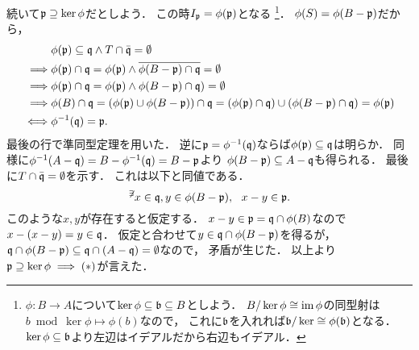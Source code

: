 \documentclass[a4paper]{jsarticle}
\begin{document}
    続いて$\mathfrak{p} \supseteq \ker \phi$だとしよう．
    この時$I_{\mathfrak{p}}=\phi(\mathfrak{p})$となる
    \footnote
    {
    $\phi: B \to A$について$\ker \phi \subseteq \mathfrak{b} \subseteq B$としよう．
    $B/\ker \phi \cong \operatorname{im} \phi$の同型射は$b \bmod \ker \phi \mapsto \phi(b)$なので，
    これに$\mathfrak{b}$を入れれば$\mathfrak{b}/\ker \cong \phi(\mathfrak{b})$となる．
    $\ker \phi \subseteq \mathfrak{b}$より左辺はイデアルだから右辺もイデアル．
    }．
    $\phi(S)=\phi(B-\mathfrak{p})$だから，
    \begin{align*}
        {}&         \phi(\mathfrak{p}) \subseteq \mathfrak{q} \land T \cap \bar{\mathfrak{q}}=\emptyset \\
        \implies&   \phi(\mathfrak{p}) \cap \mathfrak{q}=\phi(\mathfrak{p}) \land \overline{\phi(B-\mathfrak{p}) \cap \mathfrak{q}}=\emptyset \\
        \implies&   \phi(\mathfrak{p}) \cap \mathfrak{q}=\phi(\mathfrak{p}) \land \phi(B-\mathfrak{p}) \cap \mathfrak{q})=\emptyset \\
        \implies&   \phi(B) \cap \mathfrak{q}
                    =\left( \phi(\mathfrak{p}) \cup \phi(B-\mathfrak{p}) \right) \cap \mathfrak{q}
                    =(\phi(\mathfrak{p}) \cap \mathfrak{q}) \cup (\phi(B-\mathfrak{p}) \cap \mathfrak{q})
                    =\phi(\mathfrak{p}) \\
        \iff&   \phi^{-1}(\mathfrak{q})=\mathfrak{p}.
    \end{align*}
    最後の行で準同型定理を用いた．
    逆に$\mathfrak{p}=\phi^{-1}(\mathfrak{q})$ならば$\phi(\mathfrak{p}) \subseteq \mathfrak{q}$は明らか．
    同様に$\phi^{-1}(A-\mathfrak{q})=B-\phi^{-1}(\mathfrak{q})=B-\mathfrak{p}$より
    $\phi(B-\mathfrak{p}) \subseteq A-\mathfrak{q}$も得られる．
    最後に$T \cap \bar{\mathfrak{q}}=\emptyset$を示す．
    これは以下と同値である．
    \[ {}^{\not \exists} x \in \mathfrak{q}, y \in \phi(B-\mathfrak{p}),~~ x-y \in \mathfrak{p}. \]
    このような$x,y$が存在すると仮定する．
    $x-y \in \mathfrak{p}=\mathfrak{q} \cap \phi(B)$なので$x-(x-y)=y \in \mathfrak{q}$．
    仮定と合わせて$y \in \mathfrak{q} \cap \phi(B-\mathfrak{p})$を得るが，
    $\mathfrak{q} \cap \phi(B-\mathfrak{p}) \subseteq \mathfrak{q} \cap (A-\mathfrak{q})=\emptyset$なので，
    矛盾が生じた．
    以上より$\mathfrak{p} \supseteq \ker \phi \implies (*)$が言えた．
\end{document}
